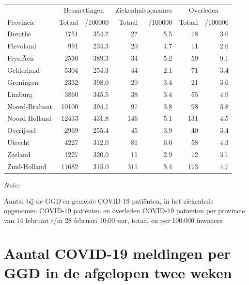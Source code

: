 \documentclass[
  english,
  man,floatsintext]{apa6}
\begin{document}
\begin{table}
\centering
\begin{threeparttable}
\begin{tabular}{lrrrrrr}
\toprule
\multicolumn{1}{c}{ } & \multicolumn{2}{c}{Besmettingen} & \multicolumn{2}{c}{Ziekenhuisopnames} & \multicolumn{2}{c}{Overleden} \\
\cmidrule(l{3pt}r{3pt}){2-3} \cmidrule(l{3pt}r{3pt}){4-5} \cmidrule(l{3pt}r{3pt}){6-7}
Provincie & Totaal & /100000 & Totaal & /100000 & Totaal & /100000\\
\midrule
Drenthe & 1751 & 354.7 & 27 & 5.5 & 18 & 3.6\\
Flevoland & 991 & 234.3 & 20 & 4.7 & 11 & 2.6\\
FryslÃ¢n & 2530 & 389.3 & 34 & 5.2 & 59 & 9.1\\
Gelderland & 5304 & 254.3 & 44 & 2.1 & 71 & 3.4\\
Groningen & 2332 & 398.0 & 20 & 3.4 & 21 & 3.6\\
Limburg & 3860 & 345.5 & 38 & 3.4 & 55 & 4.9\\
Noord-Brabant & 10100 & 394.1 & 97 & 3.8 & 98 & 3.8\\
Noord-Holland & 12433 & 431.8 & 146 & 5.1 & 131 & 4.5\\
Overijssel & 2969 & 255.4 & 45 & 3.9 & 40 & 3.4\\
Utrecht & 4227 & 312.0 & 81 & 6.0 & 58 & 4.3\\
Zeeland & 1227 & 320.0 & 11 & 2.9 & 12 & 3.1\\
Zuid-Holland & 11682 & 315.0 & 311 & 8.4 & 173 & 4.7\\
\bottomrule
\end{tabular}
\begin{tablenotes}
\item \textit{Note: } 
\item Aantal bij de GGD’en gemelde COVID-19 patiënten, in het ziekenhuis opgenomen COVID-19 patiënten en overleden COVID-19 patiënten per provincie van 14 februari t/m 28 februari 10:00 uur, totaal en per 100.000 inwoners
\end{tablenotes}
\end{threeparttable}
\end{table}

\newpage

\hypertarget{aantal-covid-19-meldingen-per-ggd-in-de-afgelopen-twee-weken}{%
\section{Aantal COVID-19 meldingen per GGD in de afgelopen twee weken}\label{aantal-covid-19-meldingen-per-ggd-in-de-afgelopen-twee-weken}}
\end{document}
